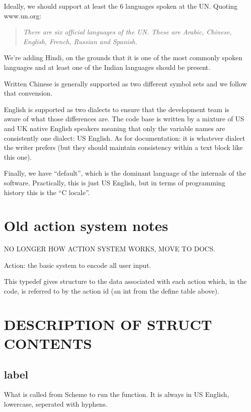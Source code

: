 \documentclass{report}
\begin{document}
Ideally, we should support at least the 6 languages spoken at the UN. Quoting www.un.org:

\begin{quote}
\emph{There are six official languages of the UN. These are Arabic, Chinese, English, French, Russian and Spanish.}
\end{quote}

We're adding Hindi, on the grounds that it is one of the most commonly spoken languages and at least one of the Indian languages should be present.

Written Chinese is generally supported as two different symbol sets and we follow that convension.

English is supported as two dialects to ensure that the development team is aware of what those differences are. The code base is written by a mixture of US and UK native English speakers meaning that only the variable names are consistently one dialect: US English. As for documentation: it is whatever dialect the writer prefers (but they should maintain consistency within a text block like this one).

Finally, we have ``default'', which is the dominant language
of the internals of the software. Practically, this is
just US English, but in terms of programming history this
is the ``C locale''. 

\section{Old action system notes}

NO LONGER HOW ACTION SYSTEM WORKS, MOVE TO DOCS.

Action: the basic system to encode all user input.

This typedef gives structure to the data associated with each action
which, in the code, is referred to by the action id (an int from
the define table above).

\section{DESCRIPTION OF STRUCT CONTENTS}

\subsection{label}

What is called from Scheme to run the function.
It is always in US English, lowercase,
seperated with hyphens.
\end{document}
